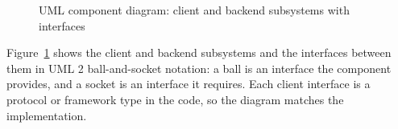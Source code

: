 \documentclass[12pt,letterpaper]{article}
\newcommand{\compicon}[1]{%
  \draw[line width=0.4pt,fill=white] ([shift={(-0.42,-0.12)}]#1.north east) rectangle ++(0.28,-0.34);
  \draw[line width=0.4pt,fill=white] ([shift={(-0.48,-0.19)}]#1.north east) rectangle ++(0.12,-0.07);
  \draw[line width=0.4pt,fill=white] ([shift={(-0.48,-0.32)}]#1.north east) rectangle ++(0.12,-0.07);
}
\begin{document}
\begin{figure}[!htbp]
{}
\caption{UML component diagram: client and backend subsystems with interfaces}
\label{fig:component}
\end{figure}

Figure~\ref{fig:component} shows the client and backend subsystems and the interfaces
between them in UML 2 ball-and-socket notation: a ball is an interface the component
provides, and a socket is an interface it requires. Each client interface is a protocol
or framework type in the code, so the diagram matches the implementation.
\end{document}
